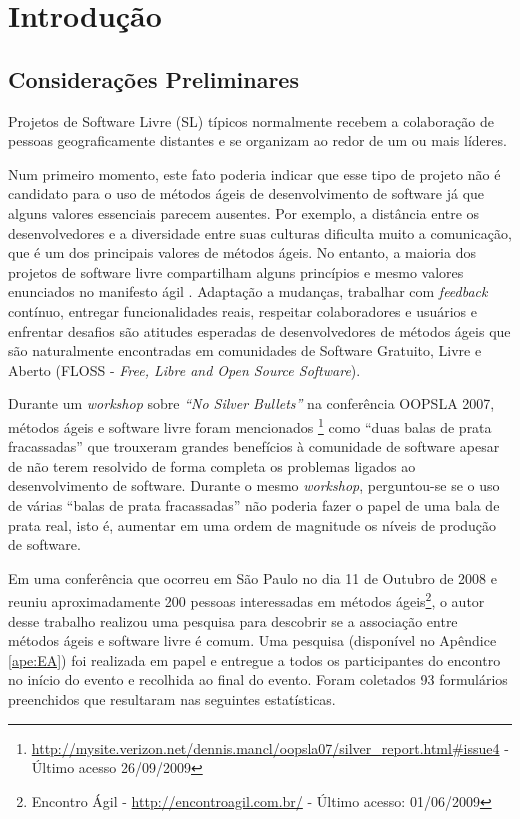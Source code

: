 \chapter{Introdução}
\label{cap:introducao}

\section{Considerações Preliminares}
\label{sec:consideracoes_preliminares}

Projetos de Software Livre (SL) típicos normalmente recebem a
colaboração de pessoas geograficamente distantes \cite{Dempsey1999} e
se organizam ao redor de um ou mais líderes.

Num primeiro momento, este fato poderia indicar que esse tipo de
projeto não é candidato para o uso de métodos ágeis de desenvolvimento
de software já que alguns valores essenciais parecem ausentes. Por
exemplo, a distância entre os desenvolvedores e a diversidade entre
suas culturas dificulta muito a comunicação, que é um dos principais
valores de métodos ágeis. No entanto, a maioria dos projetos de
software livre compartilham alguns princípios e mesmo valores
enunciados no manifesto ágil \cite{AgileManifesto}. Adaptação a
mudanças, trabalhar com \emph{feedback} contínuo, entregar
funcionalidades reais, respeitar colaboradores e usuários e enfrentar
desafios são atitudes esperadas de desenvolvedores de métodos ágeis
que são naturalmente encontradas em comunidades de Software Gratuito,
Livre e Aberto (FLOSS - \emph{Free, Libre and Open Source Software}).

Durante um \emph{workshop} \cite{OOPSLA07} sobre \emph{``No Silver
  Bullets''} \cite{Brooks1987} na conferência OOPSLA 2007, métodos
ágeis e software livre foram mencionados
\footnote{\url{http://mysite.verizon.net/dennis.mancl/oopsla07/silver_report.html\#issue4}
  - Último acesso 26/09/2009} como ``duas balas de prata fracassadas''
que trouxeram grandes benefícios à comunidade de software apesar de
não terem resolvido de forma completa os problemas ligados ao
desenvolvimento de software. Durante o mesmo \emph{workshop},
perguntou-se se o uso de várias ``balas de prata fracassadas'' não
poderia fazer o papel de uma bala de prata real, isto é, aumentar em
uma ordem de magnitude os níveis de produção de software.

Em uma conferência que ocorreu em São Paulo no dia 11 de Outubro de
2008 e reuniu aproximadamente 200 pessoas interessadas em métodos
ágeis\footnote{Encontro Ágil - \url{http://encontroagil.com.br/} -
  Último acesso: 01/06/2009}, o autor desse trabalho realizou uma
pesquisa para descobrir se a associação entre métodos ágeis e software
livre é comum. Uma pesquisa (disponível no Apêndice \ref{ape:EA}) foi
realizada em papel e entregue a todos os participantes do encontro no
início do evento e recolhida ao final do evento. Foram coletados 93
formulários preenchidos que resultaram nas seguintes estatísticas.

